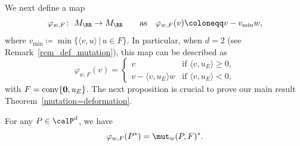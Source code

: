 We next define a map
\[
\varphi_{w,F}\colon \ M_\RR\rightarrow M_\RR \qquad \text{as} \quad \varphi_{w,F}(v)\coloneqq v-v_{\min}w,
\]
where \mbox{$v_{\min}\coloneqq {\min}\{\langle v, u\rangle\,|\, u\in F\}$}.
In particular, when $d=2$ (see Remark~\ref{rem_def_mutation}), this map can be described as
\begin{equation}\label{mutation_M}
\varphi_{w,F}(v)=
\begin{cases}
v & \text{if $\langle v,u_E\rangle\ge0$}, \\
v-\langle v,u_E\rangle w&\text{if $\langle v,u_E\rangle<0$},
\end{cases}
\end{equation}
with $F=\operatorname{conv}\{{\bf 0},u_E\}$.
The next proposition is crucial to prove our main result Theorem~\ref{mutation=deformation}.


\begin{Proposition}
\label{prop_mutation_dual_polytope}
For any $P \in \calP^d$, we have
\begin{displaymath}\varphi_{w,F}(P^*)=\mut_w(P,F)^*.
\end{displaymath}
\end{Proposition}

